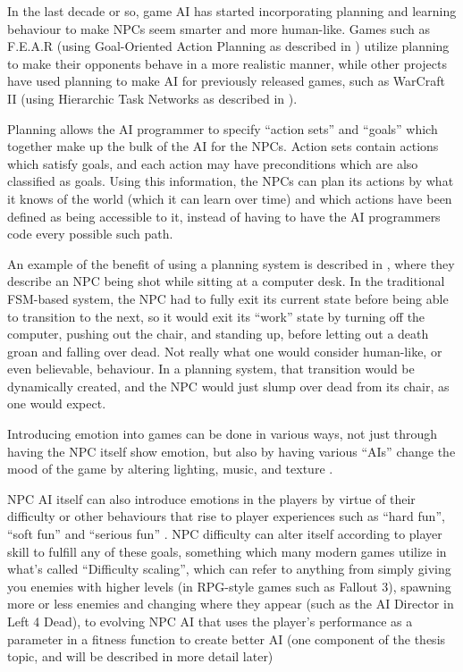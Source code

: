 In the last decade or so, game AI has started incorporating planning and
learning behaviour to make NPCs seem smarter and more human-like. Games such as
F.E.A.R (using Goal-Oriented Action Planning as described in
\citet{orkin2006three}) utilize planning to make their opponents behave in a
more realistic manner, while other projects have used planning to make AI for
previously released games, such as WarCraft II (using Hierarchic Task Networks
as described in \citet{brickmanhtn}).

Planning allows the AI programmer to specify ``action sets'' and ``goals'' which
together make up the bulk of the AI for the NPCs. Action sets contain actions
which satisfy goals, and each action may have preconditions which are also
classified as goals. Using this information, the NPCs can plan its actions by
what it knows of the world (which it can learn over time) and which actions have
been defined as being accessible to it, instead of having to have the AI
programmers code every possible such path.

An example of the benefit of using a planning system is described in
\citet{orkin2006three}, where they describe an NPC being shot while sitting at a
computer desk. In the traditional FSM-based system, the NPC had to fully exit
its current state before being able to transition to the next, so it would exit
its ``work'' state by turning off the computer, pushing out the chair, and
standing up, before letting out a death groan and falling over dead. Not really
what one would consider human-like, or even believable, behaviour. In a planning
system, that transition would be dynamically created, and the NPC would just
slump over dead from its chair, as one would expect.

Introducing emotion into games can be done in various ways, not just through
having the NPC itself show emotion, but also by having various ``AIs'' change
the mood of the game by altering lighting, music, and texture
\citep[chap.~9]{kirby2011introduction}.

NPC AI itself can also introduce emotions in the players by virtue of their
difficulty or other behaviours that rise to player experiences such as ``hard
fun'', ``soft fun'' and ``serious fun'' \citep{lazzaro2004we}. NPC difficulty
can alter itself according to player skill to fulfill any of these goals,
something which many modern games utilize in what's called ``Difficulty
scaling'', which can refer to anything from simply giving you enemies with
higher levels (in RPG-style games such as Fallout 3), spawning more or less
enemies and changing where they appear (such as the AI Director in Left 4 Dead),
to evolving NPC AI that uses the player's performance as a parameter in a
fitness function to create better AI (one component of the thesis topic, and
will be described in more detail later)

